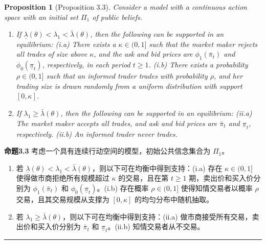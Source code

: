 \documentclass[12pt,a4paper]{article}
\newenvironment{translation}{%
  \par\vspace{2pt}\noindent%
  \color{transblue}%
  \ignorespaces
}{%
  \par\vspace{4pt}\hrule\vspace{6pt}%
}
\newtheorem{proposition}[theorem]{Proposition}
\begin{document}
\begin{proposition}[Proposition 3.3]
Consider a model with a continuous action space with an initial set $\Pi_1$ of public beliefs.
\begin{enumerate}[label=(\roman*)]
\item If $\underline{\lambda}(\theta) < \lambda_1 < \bar{\lambda}(\theta)$, then the following can be supported in an equilibrium: (i.a) There exists a $\kappa \in (0, 1]$ such that the market maker rejects all trades of size above $\kappa$, and the ask and bid prices are $\phi_1(\bar{\pi}_t)$ and $\phi_0(\underline{\pi}_t)$, respectively, in each period $t \geq 1$. (i.b) There exists a probability $\rho \in (0, 1]$ such that an informed trader trades with probability $\rho$, and her trading size is drawn randomly from a uniform distribution with support $[0, \kappa]$.
\item If $\lambda_1 \geq \bar{\lambda}(\theta)$, then the following can be supported in an equilibrium: (ii.a) The market maker accepts all trades, and ask and bid prices are $\bar{\pi}_t$ and $\underline{\pi}_t$, respectively. (ii.b) An informed trader never trades.
\end{enumerate}
\end{proposition}
\begin{translation}
\textbf{命题3.3} 考虑一个具有连续行动空间的模型，初始公共信念集合为 $\Pi_1$。
\begin{enumerate}[label=(\roman*)]
\item 若 $\underline{\lambda}(\theta) < \lambda_1 < \bar{\lambda}(\theta)$，则以下可在均衡中得到支持：(i.a) 存在 $\kappa \in (0, 1]$ 使得做市商拒绝所有规模超过 $\kappa$ 的交易，且在第 $t \geq 1$ 期，卖出价和买入价分别为 $\phi_1(\bar{\pi}_t)$ 和 $\phi_0(\underline{\pi}_t)$。(i.b) 存在概率 $\rho \in (0, 1]$ 使得知情交易者以概率 $\rho$ 交易，且其交易规模从支撑为 $[0, \kappa]$ 的均匀分布中随机抽取。
\item 若 $\lambda_1 \geq \bar{\lambda}(\theta)$，则以下可在均衡中得到支持：(ii.a) 做市商接受所有交易，卖出价和买入价分别为 $\bar{\pi}_t$ 和 $\underline{\pi}_t$。(ii.b) 知情交易者从不交易。
\end{enumerate}
\end{translation}
\end{document}
